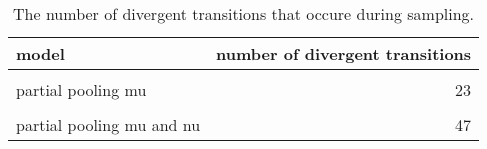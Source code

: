 \begin{table}
\centering
\caption{\label{tab:n_divergent}The number of divergent transitions that occure during sampling.}
\centering
\begin{tabular}[t]{lr}
\toprule
model & number of divergent transitions\\
\midrule
\cellcolor{gray!10}{complete pooling} & \cellcolor{gray!10}{0}\\
partial pooling mu & 23\\
\cellcolor{gray!10}{partial pooling nu} & \cellcolor{gray!10}{64}\\
partial pooling mu and nu & 47\\
\bottomrule
\end{tabular}
\end{table}
